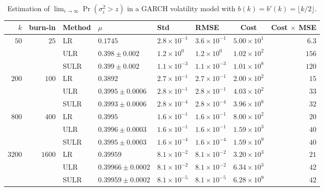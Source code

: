 \documentclass[a4paper,11pt]{article}
\begin{document}
\begin{table}
\caption{Estimation of   \(\lim_{i\rightarrow\infty}\Pr(\sigma_{i}^{2}> z)\) in a GARCH volatility model with  \(b(k)=b'(k)=\lfloor k/2\rfloor\). }
\begin{small}
\begin{tabular}{rrllllcr}\hline
$k$ &  burn-in & Method   & $\mu$  & Std & RMSE & Cost& Cost $\times$ MSE \\ \hline
$50$&$25 $&LR & $0.1745$ & $2.8\times10^{-1}$ & $3.6\times10^{-1}$ & $5.00\times10^1$ & $6.3$\\
& &ULR & $0.398 \pm 0.002$ & $1.2\times10^0$ & $1.2\times10^0$ & $1.02\times10^2$ & $156$\\
& &SULR & $0.399 \pm 0.002$ & $1.1\times10^{-3}$ & $1.1\times10^{-3}$ & $1.01\times10^8$ & $120$\\
$200$ & $100 $ &LR & $0.3892$ & $2.7\times10^{-1}$ & $2.7\times10^{-1}$ & $2.00\times10^2$ & $15$\\
& &ULR & $0.3995 \pm 0.0006$ & $2.8\times10^{-1}$ & $2.8\times10^{-1}$ & $4.03\times10^2$ & $33$\\
& &SULR & $0.3993 \pm 0.0006$ & $2.8\times10^{-4}$ & $2.8\times10^{-4}$ & $3.96\times10^8$ & $32$\\
$800$ & $400 $ &LR & $0.3995$ & $1.6\times10^{-1}$ & $1.6\times10^{-1}$ & $8.00\times10^2$ & $20$\\
& &ULR & $0.3996 \pm 0.0003$ & $1.6\times10^{-1}$ & $1.6\times10^{-1}$ & $1.59\times10^3$ & $40$\\
& &SULR & $0.3995 \pm 0.0003$ & $1.6\times10^{-4}$ & $1.6\times10^{-4}$ & $1.59\times10^9$ & $40$\\
$3200$ & $1600 $ &LR & $0.39959$ & $8.1\times10^{-2}$ & $8.1\times10^{-2}$ & $3.20\times10^3$ & $21$\\
& &ULR & $0.39966 \pm 0.0002$ & $8.1\times10^{-2}$ & $8.1\times10^{-2}$ & $6.34\times10^3$ & $42$\\
& &SULR & $0.39959 \pm 0.0002$ & $8.1\times10^{-5}$ & $8.1\times10^{-5}$ & $6.28\times10^9$ & $42$\\
\hline\end{tabular}
 \end{small}
\label{tab:GARCH0.5}
\end{table}
\end{document}

